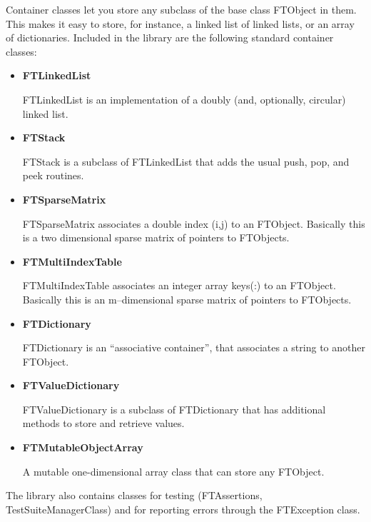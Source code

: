\documentclass[9pt]{article}
\begin{document}
 Container classes let you store any subclass of the base class FTObject in them. This makes it easy to
 store, for instance, a linked list of linked lists, or an array of dictionaries.
 Included in the library are the following standard container classes:
 \begin{itemize}
\item {\bf FTLinkedList}

FTLinkedList is an implementation of a doubly (and, optionally, circular) linked list.

\item {\bf FTStack}

FTStack is a subclass of FTLinkedList that adds the usual push, pop, and peek routines.

\item {\bf FTSparseMatrix}

FTSparseMatrix associates a double index (i,j) to an FTObject. Basically this is a two dimensional sparse matrix of pointers to FTObjects.
\item {\bf FTMultiIndexTable}

FTMultiIndexTable associates an integer array keys(:) to an FTObject. Basically this is an m--dimensional sparse matrix of pointers to FTObjects.

\item {\bf FTDictionary}

FTDictionary is an ``associative container'', that associates a string to another FTObject. 

\item {\bf FTValueDictionary}

FTValueDictionary is a subclass of FTDictionary that has additional methods to store and retrieve
values.

\item {\bf FTMutableObjectArray}

A mutable one-dimensional array class that can store any FTObject.

\end{itemize}

 The library also contains classes for testing (FTAssertions, TestSuiteManagerClass) and for reporting
 errors through the FTException class.
\end{document}
